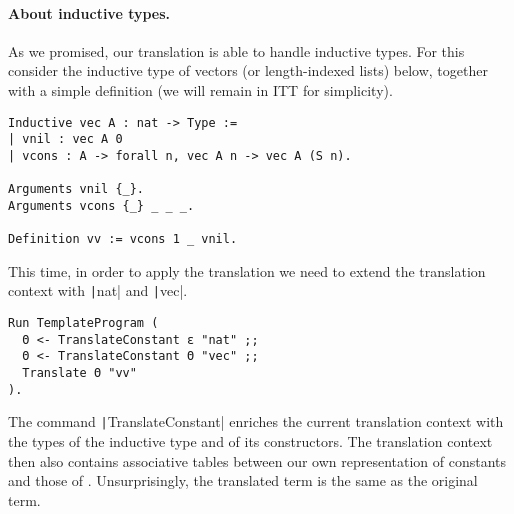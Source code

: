 \paragraph{About inductive types.}
%
As we promised, our translation is able to handle inductive types.
For this consider the inductive type of vectors (or length-indexed lists) below,
together with a simple definition (we will remain in \acrshort{ITT} for
simplicity).
%
\begin{verbatim}
Inductive vec A : nat -> Type :=
| vnil : vec A 0
| vcons : A -> forall n, vec A n -> vec A (S n).

Arguments vnil {_}.
Arguments vcons {_} _ _ _.

Definition vv := vcons 1 _ vnil.
\end{verbatim}
%
This time, in order to apply the translation we need to extend the translation
context with \texttt|nat| and \texttt|vec|.
%
\begin{verbatim}
Run TemplateProgram (
  Θ <- TranslateConstant ε "nat" ;;
  Θ <- TranslateConstant Θ "vec" ;;
  Translate Θ "vv"
).
\end{verbatim}
%
The command \texttt|TranslateConstant| enriches the current
translation context with the types of the inductive type and of its
constructors. The translation context then also contains associative
tables between our own representation of constants and those of \Coq.
Unsurprisingly, the translated \Coq term is the same as the
original term.

